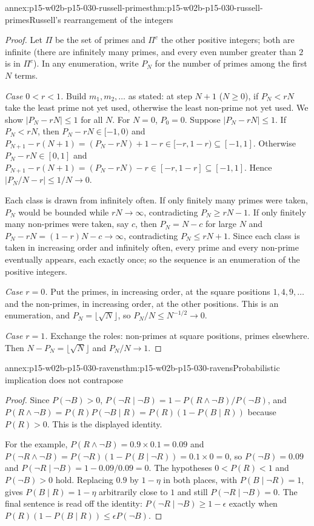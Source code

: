 \begin{annexitem}{annex:p15-w02b-p15-030-russell-primes}{thm:p15-w02b-p15-030-russell-primes}{Russell's rearrangement of the integers}
\begin{proof}
Let \(\Pi\) be the set of primes and \(\Pi^c\) the other positive integers;
both are infinite (there are infinitely many primes, and every even number
greater than \(2\) is in \(\Pi^c\)). In any enumeration, write \(P_N\) for the
number of primes among the first \(N\) terms.

\emph{Case \(0<r<1\).} Build \(m_1,m_2,\ldots\) as stated: at step \(N+1\)
(\(N\geq0\)), if \(P_N<rN\) take the least prime not yet used, otherwise the
least non-prime not yet used. We show \(|P_N-rN|\leq1\) for all \(N\). For
\(N=0\), \(P_0=0\). Suppose \(|P_N-rN|\leq1\). If \(P_N<rN\), then
\(P_N-rN\in[-1,0)\) and \(P_{N+1}-r(N+1)=(P_N-rN)+1-r\in[-r,1-r)\subseteq[-1,1]\).
Otherwise \(P_N-rN\in[0,1]\) and \(P_{N+1}-r(N+1)=(P_N-rN)-r\in[-r,1-r]
\subseteq[-1,1]\). Hence \(|P_N/N-r|\leq1/N\to0\).

Each class is drawn from infinitely often. If only finitely many primes
were taken, \(P_N\) would be bounded while \(rN\to\infty\), contradicting
\(P_N\geq rN-1\). If only finitely many non-primes were taken, say \(c\),
then \(P_N=N-c\) for large \(N\) and \(P_N-rN=(1-r)N-c\to\infty\),
contradicting \(P_N\leq rN+1\). Since each class is taken in increasing
order and infinitely often, every prime and every non-prime eventually
appears, each exactly once; so the sequence is an enumeration of the
positive integers.

\emph{Case \(r=0\).} Put the primes, in increasing order, at the square
positions \(1,4,9,\ldots\) and the non-primes, in increasing order, at the
other positions. This is an enumeration, and \(P_N=\lfloor\sqrt N\rfloor\), so
\(P_N/N\leq N^{-1/2}\to0\).

\emph{Case \(r=1\).} Exchange the roles: non-primes at square positions,
primes elsewhere. Then \(N-P_N=\lfloor\sqrt N\rfloor\) and \(P_N/N\to1\).
\end{proof}
\end{annexitem}

\begin{annexitem}{annex:p15-w02b-p15-030-ravens}{thm:p15-w02b-p15-030-ravens}{Probabilistic implication does not contrapose}
\begin{proof}
Since \(P(\neg B)>0\),
\(P(\neg R\mid\neg B)=1-P(R\land\neg B)/P(\neg B)\), and
\(P(R\land\neg B)=P(R)P(\neg B\mid R)=P(R)(1-P(B\mid R))\) because
\(P(R)>0\). This is the displayed identity.

For the example, \(P(R\land\neg B)=0.9\times0.1=0.09\) and
\(P(\neg R\land\neg B)=P(\neg R)(1-P(B\mid\neg R))=0.1\times0=0\), so
\(P(\neg B)=0.09\) and \(P(\neg R\mid\neg B)=1-0.09/0.09=0\). The hypotheses
\(0<P(R)<1\) and \(P(\neg B)>0\) hold. Replacing \(0.9\) by
\(1-\eta\) in both places, with \(P(B\mid\neg R)=1\), gives
\(P(B\mid R)=1-\eta\) arbitrarily close to \(1\) and still
\(P(\neg R\mid\neg B)=0\). The final sentence is read off the identity:
\(P(\neg R\mid\neg B)\geq1-\epsilon\) exactly when
\(P(R)(1-P(B\mid R))\leq\epsilon P(\neg B)\).
\end{proof}
\end{annexitem}


